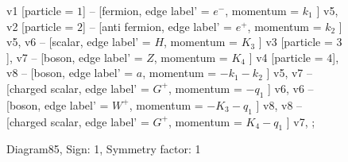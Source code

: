 \documentclass{revtex4}
\begin{document}
\begin{figure}[!htb]
\begin{center}
{    %
v1 [particle = \(1\)] -- [fermion, edge label' = \(e^{-}\), momentum = \(k_{1}\) ] v5, 
v2 [particle = \(2\)] -- [anti fermion, edge label' = \(e^{+}\), momentum = \(k_{2}\) ] v5, 
v6 -- [scalar, edge label' = \(H\), momentum = \(K_{3}\) ] v3 [particle = \(3\)], 
v7 -- [boson, edge label' = \(Z\), momentum = \(K_{4}\) ] v4 [particle = \(4\)], 
v8 -- [boson, edge label' = \(a\), momentum = \(-k_{1} - k_{2}\) ] v5, 
v7 -- [charged scalar, edge label' = \(G^{+}\), momentum = \(-q_{1}\) ] v6, 
v6 -- [boson, edge label' = \(W^{+}\), momentum = \(-K_{3} - q_{1}\) ] v8, 
v8 -- [charged scalar, edge label' = \(G^{+}\), momentum = \(K_{4} - q_{1}\) ] v7, 
};
\end{center}
\caption{Diagram85, Sign: 1, Symmetry factor: 1}
\end{figure}
\newpage
\end{document}
